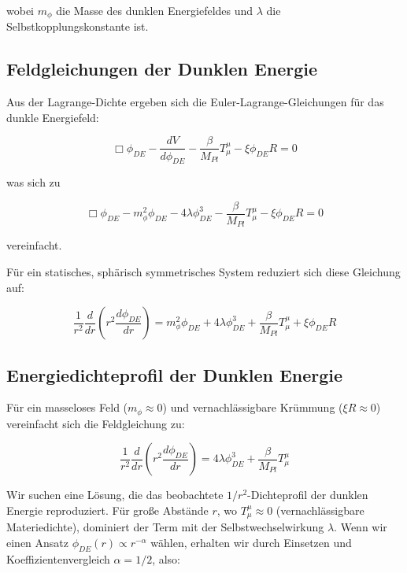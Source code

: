 \documentclass[a4paper,12pt]{article}
\theoremstyle{definition}
\theoremstyle{remark}
\begin{document}
	wobei $m_{\phi}$ die Masse des dunklen Energiefeldes und $\lambda$ die Selbstkopplungskonstante ist.
	
	\subsection{Feldgleichungen der Dunklen Energie}
	Aus der Lagrange-Dichte ergeben sich die Euler-Lagrange-Gleichungen für das dunkle Energiefeld:
	
	\begin{equation}
		\Box\phi_{DE} - \frac{dV}{d\phi_{DE}} - \frac{\beta}{M_{Pl}}T^{\mu}_{\mu} - \xi \phi_{DE} R = 0
	\end{equation}
	
	was sich zu
	
	\begin{equation}
		\Box\phi_{DE} - m_{\phi}^2\phi_{DE} - 4\lambda\phi_{DE}^3 - \frac{\beta}{M_{Pl}}T^{\mu}_{\mu} - \xi \phi_{DE} R = 0
	\end{equation}
	
	vereinfacht.
	
	Für ein statisches, sphärisch symmetrisches System reduziert sich diese Gleichung auf:
	
	\begin{equation}
		\frac{1}{r^2}\frac{d}{dr}\left(r^2\frac{d\phi_{DE}}{dr}\right) = m_{\phi}^2\phi_{DE} + 4\lambda\phi_{DE}^3 + \frac{\beta}{M_{Pl}}T^{\mu}_{\mu} + \xi \phi_{DE} R
	\end{equation}
	
	\subsection{Energiedichteprofil der Dunklen Energie}
	Für ein masseloses Feld ($m_{\phi} \approx 0$) und vernachlässigbare Krümmung ($\xi R \approx 0$) vereinfacht sich die Feldgleichung zu:
	
	\begin{equation}
		\frac{1}{r^2}\frac{d}{dr}\left(r^2\frac{d\phi_{DE}}{dr}\right) = 4\lambda\phi_{DE}^3 + \frac{\beta}{M_{Pl}}T^{\mu}_{\mu}
	\end{equation}
	
	Wir suchen eine Lösung, die das beobachtete $1/r^2$-Dichteprofil der dunklen Energie reproduziert. Für große Abstände $r$, wo $T^{\mu}_{\mu} \approx 0$ (vernachlässigbare Materiedichte), dominiert der Term mit der Selbstwechselwirkung $\lambda$. Wenn wir einen Ansatz $\phi_{DE}(r) \propto r^{-\alpha}$ wählen, erhalten wir durch Einsetzen und Koeffizientenvergleich $\alpha = 1/2$, also:
	
\end{document}
